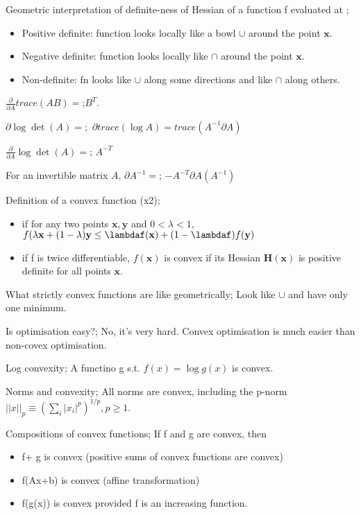 \documentclass{article}
\begin{document}
Geometric interpretation of definite-ness of Hessian of a function f evaluated at ; \begin{itemize} \item Positive definite: function looks locally like a bowl $\cup$ around the point $\mathbf{x}$. \item Negative definite: function looks locally like $\cap$ around the point $\mathbf{x}$. \item Non-definite: fn looks like $\cup$ along some directions and like $\cap$ along others. \end{itemize} 

$\frac{\partial}{\partial A}trace(AB) =$;$B^T$.

$\partial \log \det (A) =;$ $\partial trace(\log A) = trace(A^{-1}\partial A)$

$\frac{\partial}{\partial A}\log\det(A)=$; $A^{-T}$

For an invertible matrix $A$, $\partial A^{-1}=$; $-A^{-T}\partial A (A^{-1})$

Definition of a convex function (x2); \begin{itemize} \item if for any two points $\mathbf{x, y}$ and $0<\lambda < 1$, $f(\lambda\mathbf{x}+(1-\lambda)\mathbf{y}\leq \lambdaf(\mathbf{x})+(1-\lambdaf)f(\mathbf{y})$ \item if f is twice  differentiable, $f(\mathbf{x})$ is convex if its Hessian $\mathbf{H(x)}$ is positive definite for all points $\mathbf{x}$. \end{itemize}

What strictly convex functions are like geometrically; Look like $\cup$ and have only one minimum.

Is optimisation easy?; No, it's very hard. Convex optimisation is much easier than non-covex optimisation.

Log convexity; A functino g s.t. $f(x)=\log g(x)$ is convex.

Norms and convexity; All norms are convex, including the p-norm $||x||_p \equiv (\sum_i |x_i|^p)^{1/p}, p\geq 1$.

Compositions of convex functions; If f and g are convex, then \begin{itemize} \item f+ g is convex (positive sums of convex functions are convex) \item f(Ax+b) is convex (affine transformation) \item f(g(x)) is convex provided f is an increasing function. \end{itemize}
\end{document}
